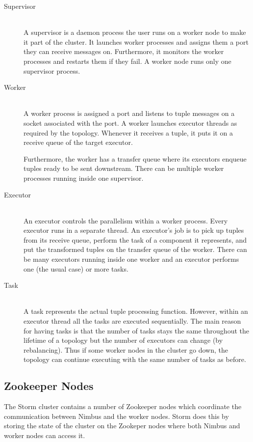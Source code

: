 \documentclass[bsc,logo,frontabs,twoside,singlespacing,normalheadings,parskip]{infthesis}\usepackage[]{graphicx}\usepackage[]{color}
\begin{document}
\begin{description}
	\item[Supervisor] \hfill \\
	A supervisor is a daemon process the user runs on a worker node to make it part of the cluster. It launches worker processes and assigns them a port they can receive messages on. Furthermore, it monitors the worker processes and restarts them if they fail. A worker node runs only one supervisor process.
	\item[Worker] \hfill \\
	A worker process is assigned a port and listens to tuple messages on a socket associated with the port. A worker launches executor threads as required by the topology. Whenever it receives a tuple, it puts it on a receive queue of the target executor.
	
	Furthermore, the worker has a transfer queue where its executors enqueue tuples ready to be sent downstream. There can be multiple worker processes running inside one supervisor.
	\item[Executor] \hfill \\
	An executor controls the parallelism within a worker process. Every executor runs in a separate thread. An executor's job is to pick up tuples from its receive queue, perform the task of a component it represents, and put the transformed tuples on the transfer queue of the worker. There can be many executors running inside one worker and an executor performs one (the usual case) or more tasks.
	\item[Task] \hfill \\
	A task represents the actual tuple processing function. However, within an executor thread all the tasks are executed sequentially. The main reason for having tasks is that the number of tasks stays the same throughout the lifetime of a topology but the number of executors can change (by rebalancing). Thus if some worker nodes in the cluster go down, the topology can continue executing with the same number of tasks as before.
\end{description}

\subsection{Zookeeper Nodes}
\label{subsec:zookeeper}

The Storm cluster contains a number of Zookeeper nodes which coordinate the communication between Nimbus and the worker nodes. Storm does this by storing the state of the cluster on the Zookeper nodes where both Nimbus and worker nodes can access it.
\end{document}
